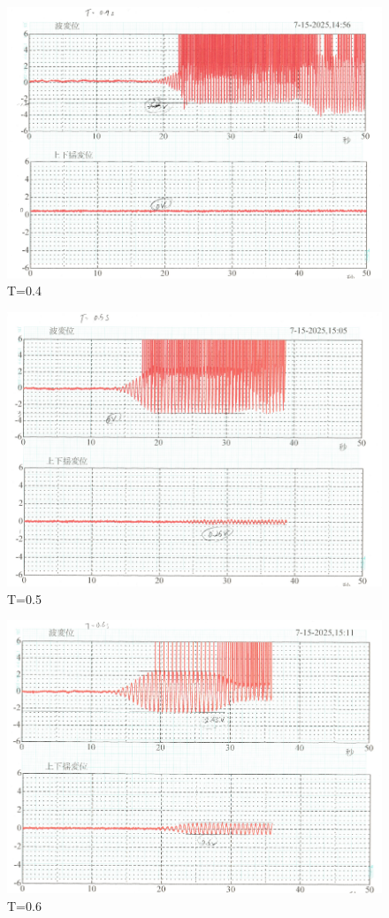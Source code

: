 \documentclass[dvipdfmx,a4paper]{jreport} %
\begin{document}
\begin{figure}[H]
    \centering
    \includegraphics[width=0.9\linewidth]{summer/ship-experiment/2d-pool/pictures/t0.4.png}
    \caption{T=0.4}
    \label{fig:t0.4}
\end{figure}
\begin{figure}[H]
    \centering
    \includegraphics[width=0.9\linewidth]{summer/ship-experiment/2d-pool/pictures/t0.5.png}
    \caption{T=0.5}
    \label{fig:t0.5}
\end{figure}
\begin{figure}[H]
    \centering
    \includegraphics[width=0.9\linewidth]{summer/ship-experiment/2d-pool/pictures/t0.6.png}
    \caption{T=0.6}
    \label{fig:t0.6}
\end{figure}
\end{document}
